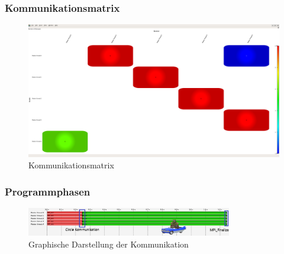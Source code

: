 \documentclass[12pt]{article}
\begin{document}
\begin{sloppypar}
\subsubsection*{Kommunikationsmatrix}
\begin{figure}[ht]
    \centering
    \caption{Kommunikationsmatrix}
    \begin{minipage}[t]{\textwidth}
        \includegraphics[width=\textwidth]{res/Communication_Matrix.png}
    \end{minipage}
\end{figure}

\subsubsection*{Programmphasen}
\begin{figure}[ht]
    \caption*{Graphische Darstellung der Kommunikation}
    \begin{minipage}[t]{1.2\textwidth}
        \includegraphics[width=0.8\textwidth]{res/Master_Timeline_edited.png}
    \end{minipage}
\end{figure}


\end{sloppypar}
\end{document}
